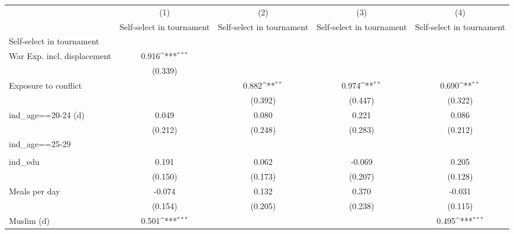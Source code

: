 {
\def\sym#1{\ifmmode^{#1}\else\(^{#1}\)\fi}
\begin{tabular}{l*{4}{c}}
\hline\hline
                    &\multicolumn{1}{c}{(1)}&\multicolumn{1}{c}{(2)}&\multicolumn{1}{c}{(3)}&\multicolumn{1}{c}{(4)}\\
                    &\multicolumn{1}{c}{Self-select in tournament}&\multicolumn{1}{c}{Self-select in tournament}&\multicolumn{1}{c}{Self-select in tournament}&\multicolumn{1}{c}{Self-select in tournament}\\
\hline
Self-select in tournament&                     &                     &                     &                     \\
War Exp. incl. displacement&       0.916\sym{***}&                     &                     &                     \\
                    &     (0.339)         &                     &                     &                     \\
[1em]
Exposure to conflict&                     &       0.882\sym{**} &       0.974\sym{**} &       0.690\sym{**} \\
                    &                     &     (0.392)         &     (0.447)         &     (0.322)         \\
[1em]
ind\_age==20-24 (d)  &       0.049         &       0.080         &       0.221         &       0.086         \\
                    &     (0.212)         &     (0.248)         &     (0.283)         &     (0.212)         \\
[1em]
ind\_age==25-29      &                     &                     &                     &                     \\
                    &                     &                     &                     &                     \\
[1em]
ind\_edu             &       0.191         &       0.062         &      -0.069         &       0.205         \\
                    &     (0.150)         &     (0.173)         &     (0.207)         &     (0.128)         \\
[1em]
Meals per day       &      -0.074         &       0.132         &       0.370         &      -0.031         \\
                    &     (0.154)         &     (0.205)         &     (0.238)         &     (0.115)         \\
[1em]
Muslim (d)          &       0.501\sym{***}&                     &                     &       0.495\sym{***}\\

\end{tabular}}
